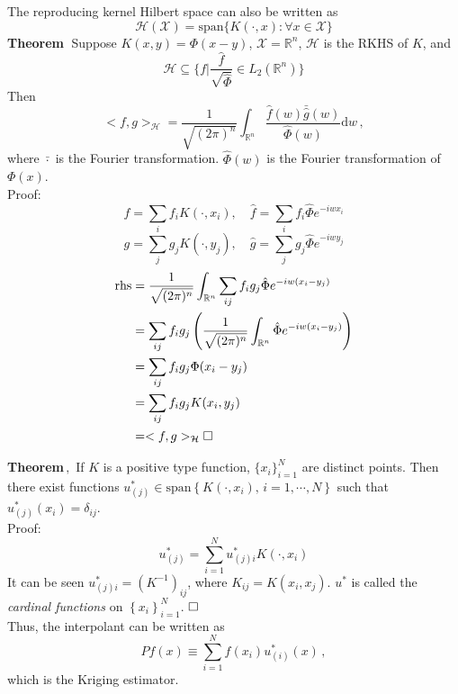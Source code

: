 \documentclass[a4paper,onecolumn]{article}
\begin{document}
\noindent The reproducing kernel Hilbert space can also be written as
$$
\mathcal{H}(\mathcal{X}) = \textrm{span}\{K(\cdot, x): \forall x\in \mathcal{X}\}
$$
\textbf{Theorem}$\;$ Suppose $K(x,y) = \Phi(x-y)$, $\mathcal{X}=\mathbb{R}^n$, $\mathcal{H}$ is the RKHS of $K$, and 
$$
    \mathcal{H} \subseteq \{f\big| \frac{\hat{f}}{\sqrt{\hat{\Phi}}}\in L_2(\mathbb{R}^n)\}
$$
Then 
$$
    <f,g>_\mathcal{H} = \frac{1}{\sqrt{(2\pi)^n}} \int_{\mathbb{R}^n} \frac{\hat{f}(w)\bar{\hat{g}}(w)}{\hat{\Phi}(w)}\textrm{d}w\,,
$$
where $\bar{\cdot}$ is the Fourier transformation. $\hat{\Phi}(w)$ is the Fourier transformation of $\Phi(x)$.\\
Proof: $$f = \sum_i f_i K(\cdot, x_i), \quad \hat{f} = \sum_i f_i \hat{\Phi}e^{-iwx_i}$$
$$g = \sum_j g_j K(\cdot, y_j), \quad \hat{g} = \sum_j g_j \hat{\Phi}e^{-iwy_j}$$
\begin{equation*}\begin{split}
    \textrm{rhs}&=\frac{1}{\sqrt{(2\pi)^n}} \int_{\mathbb{R}^n} \sum_{ij}f_i g_j \hat{\Phi} e^{-iw(x_i-y_j)}\\
    &=\sum_{ij} f_i g_j \left( \frac{1}{\sqrt{(2\pi)^n}} \int_{\mathbb{R}^n} \hat{\Phi}e^{-iw (x_i-y_j)} \right)\\
    &=\sum_{ij} f_i g_j \Phi(x_i-y_j)\\
    &=\sum_{ij} f_i g_j K(x_i, y_j)\\
    &= <f,g>_{\mathcal{H}}    \hfill \Box
\end{split}\end{equation*}

\noindent \textbf{Theorem}$\,,$ If $K$ is a positive type function, $\{x_i\}_{i=1}^N$ are distinct points.
Then there exist functions $u_{(j)}^* \in \textrm{span}\left\{ K(\cdot, x_i), \, i=1,\cdots, N\right\}$ such that
$u_{(j)}^*(x_i) = \delta_{ij}$.\\
Proof: 
$$
    u^*_{(j)} = \sum_{i=1}^N u^*_{(j)i} K(\cdot, x_i)
$$
It can be seen $u^*_{(j)i} = \left(K^{-1}\right)_{ij}$, where $K_{ij} = K(x_i, x_j)$.
$u^*$ is called the \emph{cardinal functions} on $\left\{ x_i\right\}_{i=1}^N$.
$\hfill\Box$\\

\noindent Thus, the interpolant can be written as
$$
    Pf(x) \equiv \sum_{i=1}^N f(x_i) u_{(i)}^* (x)\,,
$$
which is the Kriging estimator.\\
\end{document}
